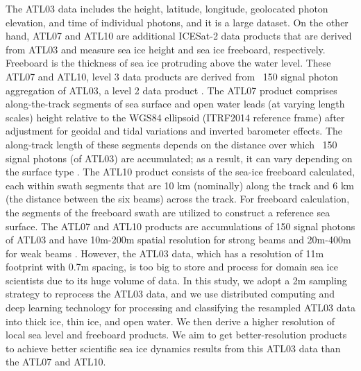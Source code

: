The ATL03 data includes the height, latitude, longitude, geolocated photon elevation, and time of individual photons, and it is a large dataset. On the other hand, ATL07 and ATL10 are additional ICESat-2 data products that are derived from ATL03 and measure sea ice height and sea ice freeboard, respectively. 
Freeboard is the thickness of sea ice protruding above the water level. 
These ATL07 and ATL10, level 3 data products are derived from ~150 signal photon aggregation of ATL03, a level 2 data product \cite{kwok2020icesat}.
The ATL07 product comprises along-the-track segments of sea surface and open water leads (at varying length scales) height relative to the WGS84 ellipsoid (ITRF2014 reference frame) after adjustment for geoidal and tidal variations and inverted barometer effects. The along-track length of these segments depends on the distance over which ~150 signal photons (of ATL03) are accumulated; as a result, it can vary depending on the surface type \cite{kwok2020icesat}. The ATL10 product consists of the sea-ice freeboard calculated, each within swath segments that are 10 km (nominally) along the track and 6 km (the distance between the six beams) across the track. For freeboard calculation, the segments of the freeboard swath are utilized to construct a reference sea surface. 
The ATL07 and ATL10 products are accumulations of 150 signal photons of ATL03 and have 10m-200m spatial resolution for strong beams and 20m-400m for weak beams \cite{kwok2019surface}. However, the ATL03 data, which has a resolution of 11m footprint with 0.7m spacing, is too big to store and process for domain sea ice scientists due to its huge volume of data. In this study, we adopt a 2m sampling strategy to reprocess the ATL03 data, and we use distributed computing and deep learning technology for processing and classifying the resampled ATL03 data into thick ice, thin ice, and open water. We then derive a higher resolution of local sea level and freeboard products. We aim to get better-resolution products to achieve better scientific sea ice dynamics results from this ATL03 data than the ATL07 and ATL10.

